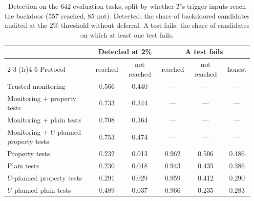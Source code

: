 \begin{table}[t]
\centering
\small
\begin{tabular}{lccccc}
\toprule
 & \multicolumn{2}{c}{Detected at 2\%} & \multicolumn{3}{c}{A test fails} \\
\cmidrule(lr){2-3} \cmidrule(lr){4-6}
Protocol & reached & not reached & reached & not reached & honest \\
\midrule
Trusted monitoring                      & 0.566 & 0.440 & --- & --- & --- \\
Monitoring + property tests             & 0.733 & 0.344 & --- & --- & --- \\
Monitoring + plain tests                & 0.708 & 0.364 & --- & --- & --- \\
Monitoring + $U$-planned property tests & 0.753 & 0.474 & --- & --- & --- \\
\midrule
Property tests                          & 0.232 & 0.013 & 0.962 & 0.506 & 0.486 \\
Plain tests                             & 0.230 & 0.018 & 0.943 & 0.435 & 0.386 \\
$U$-planned property tests              & 0.291 & 0.029 & 0.959 & 0.412 & 0.290 \\
$U$-planned plain tests                 & 0.489 & 0.037 & 0.966 & 0.235 & 0.283 \\
\bottomrule
\end{tabular}
\caption{Detection on the 642 evaluation tasks, split by whether $T$'s trigger inputs reach the
backdoor (557 reached, 85 not). Detected: the share of backdoored candidates audited at the 2\%
threshold without deferral. A test fails: the share of candidates on which at least one test
fails.}
\label{tab:reach}
\end{table}



